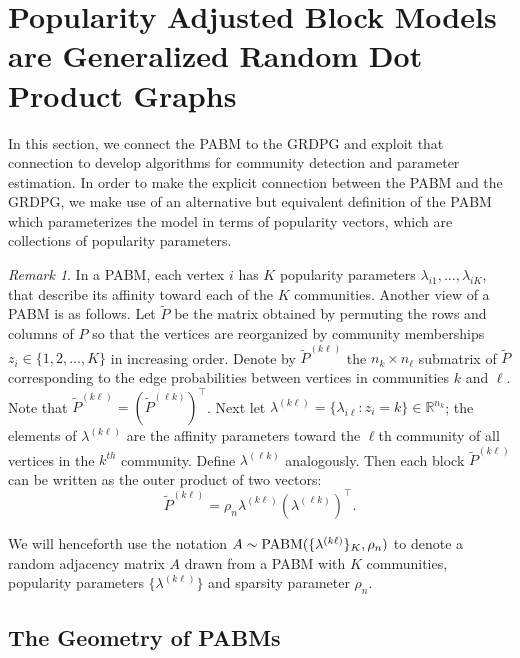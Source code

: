 \documentclass[
  12pt,
]{article}
\theoremstyle{definition}
\theoremstyle{definition}
\theoremstyle{definition}
\theoremstyle{definition}
\theoremstyle{remark}
\newtheorem*{remark}{Remark}
\begin{document}
\newpage

\hypertarget{sec:pabm-grdpg}{%
\section{Popularity Adjusted Block Models are Generalized Random Dot Product Graphs}\label{sec:pabm-grdpg}}

In this section, we connect the PABM to the GRDPG and exploit that connection to develop algorithms for community detection and parameter estimation.
In order to make the explicit connection between the PABM and the GRDPG, we make use of an alternative but equivalent definition of the PABM which parameterizes the model in terms of popularity vectors, which are collections of popularity parameters.

\begin{remark}
\label{rem:pabm_view2}
In a PABM, each vertex $i$ has $K$ popularity parameters $\lambda_{i1}, \dots, \lambda_{iK}$, that describe its affinity toward each of the $K$ communities. 
Another view of a PABM is as follows.
Let $\tilde{P}$ be the matrix obtained by permuting the rows and columns of $P$ so that the vertices are reorganized by community memberships $z_i \in \{1,2,\dots,K\}$ in increasing order. 
Denote by $\tilde{P}^{(k \ell)}$ the $n_k \times n_{\ell}$ submatrix of $\tilde{P}$ corresponding to the edge probabilities between vertices in communities $k$ and $\ell$. 
Note that $\tilde{P}^{(k \ell)} = (\tilde{P}^{(\ell k)})^\top$. 
Next let $\lambda^{(k \ell)} = \{\lambda_{i \ell} \colon z_i = k\} \in \mathbb{R}^{n_k}$; the elements of $\lambda^{(k \ell)}$ are the affinity parameters toward the $\ell$th community of all vertices in the $k^{th}$ community. 
Define $\lambda^{(\ell k)}$ analogously. 
Then each block $\tilde{P}^{(k \ell)}$ can be written as the outer product of two vectors:
\begin{equation} \label{eq:pabm}
\tilde{P}^{(k \ell)} = \rho_n \lambda^{(k \ell)} (\lambda^{(\ell k)})^{\top}.
\end{equation} 

We will henceforth use the notation \(A \sim \mathrm{PABM}(\{\lambda^{(k \ell)}\}_K, \rho_n)\) to denote a random adjacency matrix \(A\) drawn from a PABM with $K$ communities, popularity parameters \(\{\lambda^{(k \ell)}\}\) and sparsity parameter $\rho_n$.
\end{remark}

\hypertarget{the-geometry-of-pabms}{%
\subsection{The Geometry of PABMs}\label{the-geometry-of-pabms}}
\end{document}
